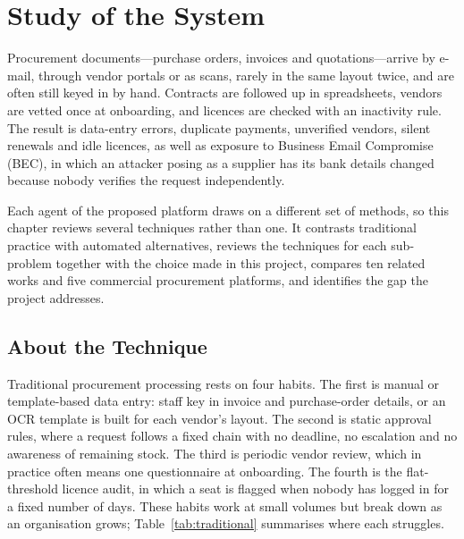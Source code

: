 
\chapter{Study of the System} \label{chap2}
\newpage

Procurement documents---purchase orders, invoices and quotations---arrive by e-mail, through vendor portals or as scans, rarely in the same layout twice, and are often still keyed in by hand. Contracts are followed up in spreadsheets, vendors are vetted once at onboarding, and licences are checked with an inactivity rule. The result is data-entry errors, duplicate payments, unverified vendors, silent renewals and idle licences, as well as exposure to Business Email Compromise (BEC), in which an attacker posing as a supplier has its bank details changed because nobody verifies the request independently.

Each agent of the proposed platform draws on a different set of methods, so this chapter reviews several techniques rather than one. It contrasts traditional practice with automated alternatives, reviews the techniques for each sub-problem together with the choice made in this project, compares ten related works and five commercial procurement platforms, and identifies the gap the project addresses.

\section{About the Technique}
Traditional procurement processing rests on four habits. The first is manual or template-based data entry: staff key in invoice and purchase-order details, or an OCR template is built for each vendor's layout. The second is static approval rules, where a request follows a fixed chain with no deadline, no escalation and no awareness of remaining stock. The third is periodic vendor review, which in practice often means one questionnaire at onboarding. The fourth is the flat-threshold licence audit, in which a seat is flagged when nobody has logged in for a fixed number of days. These habits work at small volumes but break down as an organisation grows; Table~\ref{tab:traditional} summarises where each struggles.

